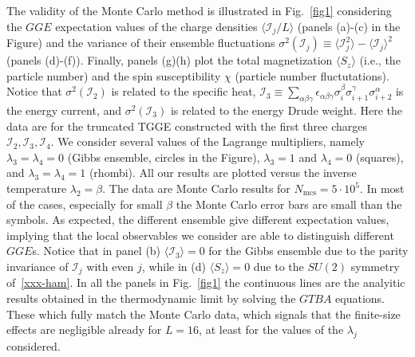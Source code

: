 \documentclass[twocolumn,superscriptaddress,prb,10pt]{revtex4-1}
\begin{document}
The validity of the Monte Carlo method is illustrated in Fig.~\ref{fig1} considering 
the $GGE$ expectation values of the charge densities $\langle {\mathcal I}_j/L\rangle$ 
(panels (a)-(c) in the Figure) and the variance of their ensemble fluctuations 
$\sigma^2({\mathcal I}_j)\equiv \langle{\mathcal I}^2_j\rangle-\langle{\mathcal I}_j\rangle^2$
(panels (d)-(f)). Finally, panels (g)(h) plot the total magnetization $\langle S_z\rangle$ 
(i.e., the particle number) and the spin susceptibility $\chi$ (particle number fluctutations). 
Notice that $\sigma^2({\mathcal I}_2)$ is related to the specific heat, ${\mathcal I}_3\equiv
\sum_{\alpha\beta\gamma}\epsilon_{\alpha\beta\gamma}\sigma^\beta_i\sigma^\gamma_{i+1}
\sigma^\alpha_{i+2}$ is the energy current, and $\sigma^2({\mathcal I}_3)$ is related 
to the energy Drude weight. Here the data are for the truncated TGGE constructed with the first 
three charges ${\mathcal I}_2,{\mathcal I}_3,{\mathcal I}_4$. We consider several values of 
the Lagrange multipliers, namely $\lambda_3=\lambda_4=0$ (Gibbs ensemble, circles in the 
Figure), $\lambda_3=1$ and $\lambda_4=0$ (squares), and $\lambda_3=\lambda_4=1$ (rhombi). 
All our results are plotted versus the inverse temperature $\lambda_2=\beta$. The data 
are Monte Carlo results for $N_{\textrm{mcs}}=5\cdot 10^5$. In most of the cases, 
especially for small $\beta$ the Monte Carlo error bars are small than the symbols. 
As expected, the different ensemble give different expectation values, implying that 
the local observables we consider are able to distinguish different $GGE$s. Notice that 
in panel (b) $\langle {\mathcal I}_3\rangle=0$ for the Gibbs ensemble due to the parity 
invariance of ${\mathcal I}_j$ with even $j$, while in (d) $\langle S_z\rangle=0$ 
due to the $SU(2)$ symmetry of~\eqref{xxx-ham}. 
In all the panels in Fig.~\ref{fig1} the continuous lines are the analyitic results obtained 
in the thermodynamic limit by solving the $GTBA$ equations. These which fully match the Monte 
Carlo data, which signals  that the finite-size effects are negligible already for $L=16$, 
at least for the values of the $\lambda_j$ considered. 
\end{document}
